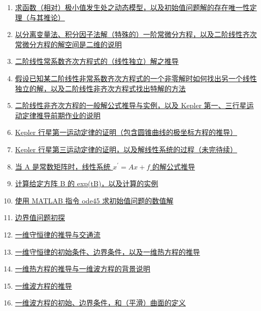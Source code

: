 \documentclass[11pt]{article}
\begin{document}
\begin{enumerate}
	\item \href{https://mp.weixin.qq.com/s/g_u60GMr_Uc4C9xN_0_8lg}{求函数（相对）极小值发生处之动态模型，以及初始值问题解的存在唯一性定理（与其推论）}	%
	\item \href{https://mp.weixin.qq.com/s/UySnEJVxvKr-gQcrF4H-hQ}{以分离变量法、积分因子法解（特殊的）一阶常微分方程，以及二阶线性齐次常微分方程的解空间是二维的说明}	%
	\item \href{https://mp.weixin.qq.com/s/jMQUWPXcW5k2eFpg8lGLiA}{二阶线性常系数齐次方程式的（线性独立）解之推导}	%
	\item \href{https://mp.weixin.qq.com/s/gfjQBtXyNHocDwkzhSlFzQ}{假设已知某二阶线性非常系数齐次方程式的一个非零解时如何找出另一个线性独立的解，以及二阶线性非齐次方程式找出特解的方法}	%
	\item \href{https://mp.weixin.qq.com/s/9xPsXKFF365GO-1Xc-v_kA}{二阶线性非齐次方程的一般解公式推导与实例，以及 Kepler 第一、三行星运动定律推导前期作业的说明}	%
	\item \href{https://mp.weixin.qq.com/s/DOwEL62ZdOXF36VMXZFIhA}{Kepler 行星第一运动定律的证明（包含圆锥曲线的极坐标方程的推导）}	%
	\item \href{https://mp.weixin.qq.com/s/YQZ0TJPxKbTdcdtu71hmHA}{Kepler 行星第三运动定律的证明，以及解线性系统的过程（未完待续）}	%
	\item \href{https://mp.weixin.qq.com/s/SLHqcnTgmTwkBNwxjbTgfA}{当 A 是常数矩阵时，线性系统 $x^{\prime}=Ax+f$ 的解公式推导}	%
	\item \href{https://mp.weixin.qq.com/s/9Yxy3rB_dg0HeLG2KXtmUA}{计算给定方阵 B 的 exp(tB)，以及计算的实例}	%
	\item \href{https://mp.weixin.qq.com/s/ebOGDJLcwwHs9GYFs48iNQ}{使用 MATLAB 指令 ode45 求初始值问题的数值解}	%
	\item \href{https://mp.weixin.qq.com/s/qU26pNWshic2gwsIjuvSwA}{边界值问题初探}	%
	\item \href{https://mp.weixin.qq.com/s/jxfUBOgatoZhEDViMG6-bA}{一维守恒律的推导与交通流}	%
	\item \href{https://mp.weixin.qq.com/s/O6FMMARN8yjDVbPVrG_mGA}{一维守恒律的初始条件、边界条件，以及一维热方程的推导}	%
	\item \href{https://mp.weixin.qq.com/s/EB2PYkq3OVQ8BTBnzAraBA}{一维热方程的推导与一维波方程的背景说明}	%
	\item \href{https://mp.weixin.qq.com/s/kon_u8xBIj-nERMris5rvA}{一维波方程的推导}	%
	\item \href{https://mp.weixin.qq.com/s/pVgUfgMS2fbW30ZOXqaZWw}{一维波方程的初始、边界条件，和（平滑）曲面的定义}	%

\end{enumerate}
\end{document}
